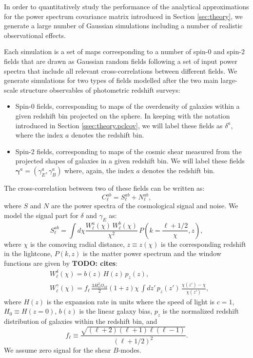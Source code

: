 \documentclass[a4paper,11pt]{article}
\newcommand{\todo}[1]{{\bf TODO: #1}}
\begin{document}
      In order to quantitatively study the performance of the analytical approximations for the power spectrum covariance matrix introduced in Section \ref{sec:theory}, we generate a large number of Gaussian simulations including a number of realistic observational effects.
      
      Each simulation is a set of maps corresponding to a number of spin-0 and spin-2 fields that are drawn as Gaussian random fields following a set of input power spectra that include all relevant cross-correlations between different fields. We generate simulations for two types of fields modelled after the two main large-scale structure observables of photometric redshift surveys:
      \begin{itemize}
        \item Spin-0 fields, corresponding to maps of the overdensity of galaxies within a given redshift bin projected on the sphere. In keeping with the notation introduced in Section \ref{ssec:theory.pclcov}, we will label these fields as $\delta^a$, where the index $a$ denotes the redshift bin.
        \item Spin-2 fields, corresponding to maps of the cosmic shear measured from the projected shapes of galaxies in a given redshift bin. We will label these fields $\mathbf{\gamma}^a=(\gamma_E^a,\gamma_B^a)$ where, again, the index $a$ denotes the redshift bin.
      \end{itemize}
      The cross-correlation between two of these fields can be written as:
      \begin{equation}
        C^{ab}_\ell = S^{ab}_\ell+N^{ab}_\ell,
      \end{equation}
      where $S$ and $N$ are the power spectra of the cosmological signal and noise. We model the signal part for $\delta$ and $\gamma_E$ as:
      \begin{equation}
        S^{ab}_\ell = \int d\chi \frac{W^a_\ell(\chi)\,W^b_\ell(\chi)}{\chi^2}\,P\left(k=\frac{\ell+1/2}{\chi},z\right),
      \end{equation}
      where $\chi$ is the comoving radial distance, $z\equiv z(\chi)$ is the corresponding redshift in the lightcone, $P(k,z)$ is the matter power spectrum and the window functions are given by \todo{cites}:
      \begin{align}
        &W^\delta_\ell(\chi)=b(z)\,H(z)\,p_z(z),\\
        &W^\gamma_\ell(\chi)=f_\ell\,\frac{3H_0^2\Omega_M}{2}(1+z)\chi\,\int dz'\,p_z(z')\,\frac{\chi(z')-\chi}{\chi(z')},
      \end{align}
      where $H(z)$ is the expansion rate in units where the speed of light is $c=1$, $H_0\equiv H(z=0)$, $b(z)$ is the linear galaxy bias, $p_z$ is the normalized redshift distribution of galaxies within the redshift bin, and
      \begin{equation}
        f_\ell\equiv\frac{\sqrt{(\ell+2)(\ell+1)\ell(\ell-1)}}{(\ell+1/2)^2}.
      \end{equation}
      We assume zero signal for the shear $B$-modes.
\end{document}
